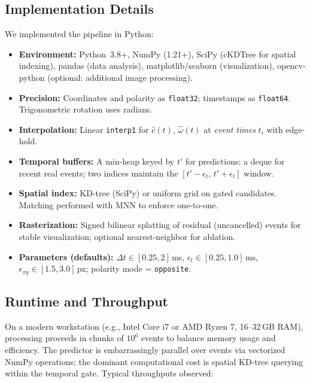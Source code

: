 \subsection{Implementation Details}
We implemented the pipeline in Python:
\begin{itemize}
    \item \textbf{Environment:} Python~3.8+, NumPy (1.21+), SciPy (cKDTree for spatial indexing), pandas (data analysis), matplotlib/seaborn (visualization), opencv-python (optional: additional image processing).
  \item \textbf{Precision:} Coordinates and polarity as \texttt{float32}; timestamps as \texttt{float64}. Trigonometric rotation uses radians.
  \item \textbf{Interpolation:} Linear \texttt{interp1} for $\hat c(t)$, $\hat\omega(t)$ at \emph{event times} $t_i$ with edge-hold.
  \item \textbf{Temporal buffers:} A min-heap keyed by $t'$ for predictions; a deque for recent real events; two indices maintain the $[t'-\epsilon_t,\,t'+\epsilon_t]$ window.
  \item \textbf{Spatial index:} KD-tree (SciPy) or uniform grid on gated candidates. Matching performed with MNN to enforce one-to-one.
  \item \textbf{Rasterization:} Signed bilinear splatting of residual (uncancelled) events for stable visualization; optional nearest-neighbor for ablation.
  \item \textbf{Parameters (defaults):} $\Delta t \in [0.25, 2]$\,ms, $\epsilon_t \in [0.25, 1.0]$\,ms, $\epsilon_{xy}\in [1.5, 3.0]$\,px; polarity mode = \texttt{opposite}.
\end{itemize}

\subsection{Runtime and Throughput}
On a modern workstation (e.g., Intel Core i7 or AMD Ryzen 7, 16--32\,GB RAM), processing proceeds in chunks of $10^6$ events to balance memory usage and efficiency. The predictor is embarrassingly parallel over events via vectorized NumPy operations; the dominant computational cost is spatial KD-tree querying within the temporal gate. Typical throughputs observed:

